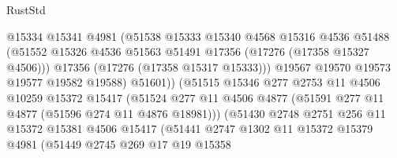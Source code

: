 \begin{lexlean}{RustStd}
\begin{coremodule}
                                  @15334
                                  @15341
                                  @4981
                                  (@51538
                                    @15333
                                    @15340
                                    @4568
                                    @15316
                                    @4536
                                    @51488
                                    (@51552
                                      @15326
                                      @4536
                                      @51563
                                      @51491
                                      @17356
                                      (@17276 (@17358 @15327 @4506)))
                                    @17356
                                    (@17276 (@17358 @15317 @15333)))
                                  @19567
                                  @19570
                                  @19573
                                  @19577
                                  @19582
                                  @19588)
                                @51601))
                            (@51515
                              @15346
                              @277
                              @2753
                              @11
                              @4506
                              @10259
                              @15372
                              @15417
                              (@51524
                                @277
                                @11
                                @4506
                                @4877
                                (@51591 @277 @11 @4877 (@51596 @274 @11 @4876 @18981)))
                              (@51430
                                @2748
                                @2751
                                @256
                                @11
                                @15372
                                @15381
                                @4506
                                @15417
                                (@51441
                                  @2747
                                  @1302
                                  @11
                                  @15372
                                  @15379
                                  @4981
                                  (@51449
                                    @2745
                                    @269
                                    @17
                                    @19
                                    @15358

\end{coremodule}
\end{lexlean}
